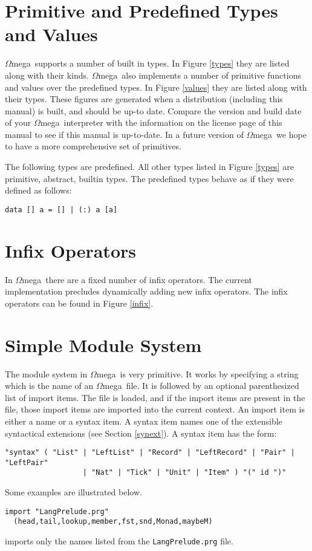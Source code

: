 \documentclass[11pt,twoside]{article}
\newcommand{\om}{$\Omega$mega}
\begin{document}

%

\section{Primitive and Predefined Types and Values} \label{predefined}

\om\ supports a number of built in types. In Figure \ref{types} they are listed
along with their kinds. \om\ also implements a number of primitive
functions and values over the predefined types. In Figure \ref{values} they are
listed along with their types. These figures are generated when a
distribution (including this manual) is built, and should be up-to date. Compare
the version and build date of your \om\ interpreter with the information on the
license page of this manual to see if this manual is up-to-date. In a future
version of \om\ we hope to have a more comprehensive set of primitives.

The following types are predefined. All other types listed in Figure \ref{types}
are primitive, abstract, builtin types. The
predefined types behave as if they were defined as follows:



\begin{verbatim}
data [] a = [] | (:) a [a]
\end{verbatim}

\section{Infix Operators} \label{op}
In \om\ there are a fixed number of infix operators. The current implementation
precludes dynamically adding new infix operators. The infix operators can be
found in Figure \ref{infix}.


\section{Simple Module System} \label{module}
The module system in \om\ is very primitive. It works by specifying
a string which is the name of an \om\ file. It is followed
by an optional parenthesized list of import items. The file is loaded, and
if the import items are present in the file, those import items
are imported into the current context. An import item is either a name
or a syntax item. A syntax item names one of the extensible syntactical extensions
(see Section \ref{synext}). A syntax
item has the form:
\begin{verbatim}
"syntax" ( "List" | "LeftList" | "Record" | "LeftRecord" | "Pair" | "LeftPair"
                  | "Nat" | "Tick" | "Unit" | "Item" ) "(" id ")"
\end{verbatim}
Some examples are illustrated below.
\begin{verbatim}
import "LangPrelude.prg"
  (head,tail,lookup,member,fst,snd,Monad,maybeM)
\end{verbatim}
imports only the names listed from the {\tt LangPrelude.prg} file.
\end{document}
